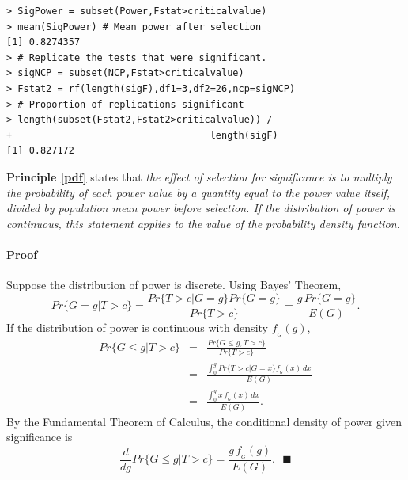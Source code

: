 \documentclass[jou]{apa6} %
\begin{document}
{\footnotesize
\begin{verbatim}
> SigPower = subset(Power,Fstat>criticalvalue)
> mean(SigPower) # Mean power after selection
[1] 0.8274357
> # Replicate the tests that were significant.
> sigNCP = subset(NCP,Fstat>criticalvalue)
> Fstat2 = rf(length(sigF),df1=3,df2=26,ncp=sigNCP)
> # Proportion of replications significant
> length(subset(Fstat2,Fstat2>criticalvalue)) / 
+                                   length(sigF)
[1] 0.827172
\end{verbatim}
} %

\textbf{Principle \ref{pdf}} states that \emph{the effect of selection for significance is to multiply the probability of each power value by a quantity equal to the power value itself, divided by population mean power before selection. If the distribution of power is continuous, this statement applies to the value of the probability density function.}
\paragraph{Proof} Suppose the distribution of power is discrete. Using Bayes' Theorem, 
\begin{equation} \label{CondProb}
    Pr\{G=g|T>c\} = \frac{Pr\{T>c|G=g\} Pr\{G=g\}}{Pr\{T>c\}} = \frac{g \, Pr\{G=g\}}{E(G)}.
\end{equation}
If the distribution of power is continuous with density $f_{_G}(g)$,
\begin{eqnarray*}
    Pr\{G \leq g|T>c\} & = &  \frac{Pr\{G \leq g, T>c\}}{Pr\{T>c\}}  \\
    & = &  \frac{\int_0^g Pr\{T>c|G=x\} f_{_G}(x) \, dx }{E(G)}  \\
    & = &  \frac{\int_0^g x \, f_{_G}(x) \, dx }{E(G)}. 
\end{eqnarray*}
By the Fundamental Theorem of Calculus, the conditional density of power given significance is
\begin{equation} \label{CondDens}
    \frac{d}{dg}Pr\{G \leq g|T>c\} = \frac{g \, f_{_G}(g)}{E(G)}.~~~\blacksquare
\end{equation}
\end{document}
